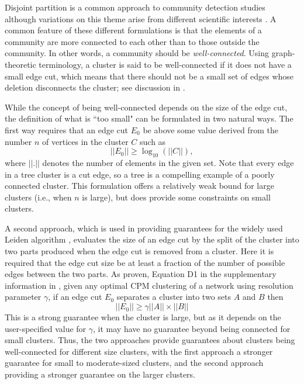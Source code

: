 \documentclass[12pt, oneside]{article}   	%
\begin{document}
Disjoint partition is a  common approach to community detection studies \citep{Fortunato2022,Fortunato2010} although variations on this theme arise from different scientific interests \citep{Coscia2011,Schaub2017}. 
A common feature of these different formulations is that  the elements of a community are more connected to each other than to those outside the community. In other words, a community 
should be {\em well-connected}. Using graph-theoretic terminology, a cluster is said to be well-connected if it does not have a small edge cut, which means that there should not be a small set of edges whose deletion 
disconnects the cluster; see discussion in \cite{Traag_2019}. 

While the concept of being well-connected depends on the size of the edge cut, the definition of what is ``too small" can be formulated in two
natural ways.
The first way
requires that an edge cut  $E_0$ be above some value derived from the number $n$ of 
vertices in the cluster $C$ such as $$||E_0|| \geq \log_{10}(||C||),$$    where $||.||$ denotes the number of elements in the given set.
Note that every edge in  a tree cluster is a cut edge, so a tree is  a compelling example of a poorly connected cluster. 
This formulation offers a relatively weak bound for large clusters (i.e., when   $n$ is large), but does provide some constraints on small clusters. 

A second approach, which is used in providing guarantees for the widely used Leiden algorithm \citep{Traag_2019}, evaluates the size of an edge cut by the split  of the cluster into two parts produced 
when the edge cut is removed from a cluster. Here it is required that the edge cut size be at least a fraction of the number of possible edges between the two  parts.
As proven, Equation D1 in the supplementary information in \cite{Traag_2019}, given any optimal CPM clustering of a network using resolution parameter $\gamma$, if an edge cut $E_0$
separates a cluster into two sets $A$ and $B$ then $$||E_0|| \geq \gamma ||A|| \times ||B||$$
This is a strong guarantee when the cluster is large,  but as it depends on the user-specified value for $\gamma$, it may have no guarantee  beyond being connected for small clusters.
Thus, the two approaches provide guarantees about clusters being well-connected for different size clusters, with the first approach a stronger guarantee for small to moderate-sized clusters, and the second approach providing a stronger guarantee on the larger clusters.
\end{document}
